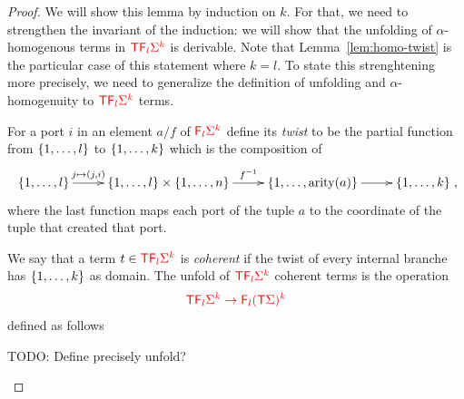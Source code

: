 \begin{proof}
We will show this lemma by induction on $k$. For that, we need to strengthen the invariant of the induction: we will show that the unfolding of $\alpha$-homogenous terms in ${\color{red}{{\color{red}{\mathsf T}}{\color{red}{\mathsf F_{l}}}{\color{red}{\Sigma}}^k}}$ is derivable. Note that Lemma~\ref{lem:homo-twist} is the particular case of this statement where $k=l$. To state this strenghtening more precisely, we need to generalize the definition of unfolding and $\alpha$-homogenuity to ${\color{red}{{\color{red}{\mathsf T}}{\color{red}{\mathsf F_{l}}}{\color{red}{\Sigma}}^k}}$ terms.

For a port $i$ in an element $a/f$ of ${\color{red}{{\color{red}{\mathsf F_{l}}}{\color{red}{\Sigma}}^k}}$ define its \emph{twist} to be the partial function from $\{1,\ldots,l\}$ to $\{1,\ldots,k\}$
which is the composition of 
\begin{align*}
\xymatrix{
    \set{1,\ldots,l} \ar[r]^-{j \mapsto {(j,i)}} & \set{1,\ldots,l} \times \set{1,\ldots,n} \ar[r]^-{f^{-1}} & \set{1,\ldots,\arity a} \ar[r] & \set{1,\ldots,k}
},
\end{align*}
where the last function maps each port of the tuple $a$ to the coordinate of the tuple that created that port. 

We say that a term $t\in {\color{red}{{\color{red}{\mathsf T}}{\color{red}{\mathsf F_{l}}}\Sigma^k}}$ is \emph{coherent} if the twist of every internal branche has $\{1,\ldots,k\}$ as domain. The unfold of ${\color{red}{{\color{red}{\mathsf T}}{\color{red}{\mathsf F_{l}}}\Sigma^k}}$ coherent terms is the operation 
\begin{align*}
{\color{red}{{\color{red}{\mathsf T}}{\color{red}{\mathsf F_{l}}}\Sigma^k \to {\color{red}{\mathsf F_{l}}}({\color{red}{\mathsf T}}\Sigma)^k}}
\end{align*}
defined as follows
\begin{center}
TODO: {Define precisely unfold?}
\end{center}


\end{proof}
